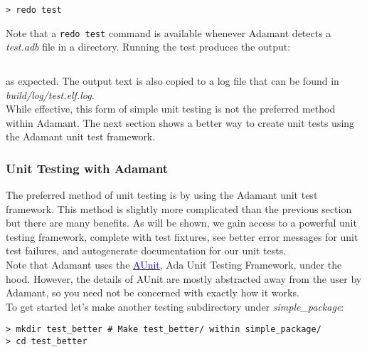 \vspace{5mm} %
\begin{verbatim}
> redo test
\end{verbatim}
\vspace{5mm} %

Note that a \texttt{redo test} command is available whenever Adamant detects a \textit{test.adb} file in a directory. Running the test produces the output:

\vspace{5mm} %
\inputminted{text}{../example_architecture/simple_package/test/output.txt}
\vspace{5mm} %

as expected. The output text is also copied to a log file that can be found in \textit{build/log/test.elf.log}. \\

While effective, this form of simple unit testing is not the preferred method within Adamant. The next section shows a better way to create unit tests using the Adamant unit test framework.

\subsubsection{Unit Testing with Adamant} \label{Unit Testing with Adamant}

The preferred method of unit testing is by using the Adamant unit test framework. This method is slightly more complicated than the previous section but there are many benefits. As will be shown, we gain access to a powerful unit testing framework, complete with test fixtures, see better error messages for unit test failures, and autogenerate documentation for our unit tests. \\

Note that Adamant uses the \href{http://docs.adacore.com/live/wave/aunit/html/aunit_cb/aunit_cb.html}{\textcolor{blue}{AUnit}}, Ada Unit Testing Framework, under the hood. However, the details of AUnit are mostly abstracted away from the user by Adamant, so you need not be concerned with exactly how it works. \\

To get started let's make another testing subdirectory under \textit{simple\_package}:

\vspace{5mm} %
\begin{verbatim}
> mkdir test_better # Make test_better/ within simple_package/
> cd test_better
\end{verbatim}
\vspace{5mm} %

